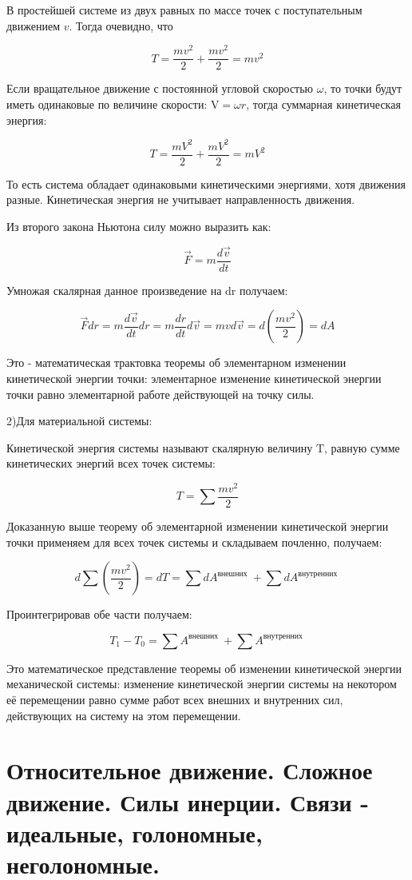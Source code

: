 В простейшей системе из двух равных по массе точек с поступательным движением $v$. Тогда очевидно, что

$$
T=\frac{m v^{2}}{2}+\frac{m v^{2}}{2}=m v^{2}
$$

Если вращательное движение с постоянной угловой скоростью $\omega$, то точки будут иметь одинаковые по величине скорости: $\mathrm{V}=\omega r$, тогда суммарная кинетическая энергия:

$$
T=\frac{m V^{2}}{2}+\frac{m V^{2}}{2}=m V^{2}
$$

То есть система обладает одинаковыми кинетическими энергиями, хотя движения разные. Кинетическая энергия не учитывает направленность движения.

Из второго закона Ньютона силу можно выразить как:

$$
\vec{F}=m \frac{d \vec{v}}{d t}
$$

Умножая скалярная данное произведение на dr получаем:

$$
\vec{F} d r=m \frac{d \vec{v}}{d t} d r=m \frac{d r}{d t} d \vec{v}=m v d \vec{v}=d\left(\frac{m v^{2}}{2}\right)=d A
$$

Это - математическая трактовка теоремы об элементарном изменении кинетической энергии точки: элементарное изменение кинетической энергии точки равно элементарной работе действующей на точку силы.

2)Для материальной системы:


Кинетической энергия системы называют скалярную величину $\mathrm{T}$, равную сумме кинетических энергий всех точек системы:

$$
T=\sum \frac{m v^{2}}{2}
$$

Доказанную выше теорему об элементарной изменении кинетической энергии точки применяем для всех точек системы и складываем почленно, получаем:

$$
d \sum\left(\frac{m v^{2}}{2}\right)=d T=\sum d A^{\text {внешних }}+\sum d A^{\text {внутренних }}
$$

Проинтегрировав обе части получаем:

$$
T_{1}-T_{0}=\sum A^{\text {внешних }}+\sum A^{\text {внутренних }}
$$

Это математическое представление теоремы об изменении кинетической энергии механической системы: изменение кинетической энергии системы на некотором её перемещении равно сумме работ всех внешних и внутренних сил, действующих на систему на этом перемещении.

\section{Относительное движение. Сложное движение. Силы инерции. Связи - идеальные, голономные, неголономные.}

